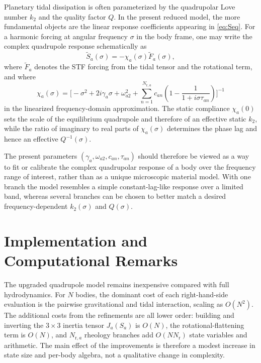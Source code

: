 \documentclass[journal, a4paper]{IEEEtran}
\begin{document}
Planetary tidal dissipation is often parameterized by the quadrupolar Love
number $k_2$ and the quality factor $Q$. In the present reduced model, the
more fundamental objects are the linear response coefficients appearing in
\eqref{eq:Seq}. For a harmonic forcing at angular frequency $\sigma$ in the
body frame, one may write the complex quadrupole response schematically as
\begin{equation}
\widetilde S_a(\sigma)
=
-\chi_a(\sigma)
\widetilde F_a(\sigma),
\label{eq:chiDef}
\end{equation}
where $\widetilde F_a$ denotes the STF forcing from the tidal tensor and the
rotational term, and where
\begin{equation}
\chi_a(\sigma)
=
\Biggl[
-\sigma^2
+2i\gamma_a\sigma
+\omega_{a2}^2
+\sum_{n=1}^{N_{\mathrm{r},a}}
c_{an}
\left(
1-\frac{1}{1+i\sigma\tau_{an}}
\right)
\Biggr]^{-1}
\label{eq:chiModel}
\end{equation}
in the linearized frequency-domain approximation. The static compliance
$\chi_a(0)$ sets the scale of the equilibrium quadrupole and therefore of an
effective static $k_2$, while the ratio of imaginary to real parts of
$\chi_a(\sigma)$ determines the phase lag and hence an effective
$Q^{-1}(\sigma)$.

The present parameters $(\gamma_a,\omega_{a2},c_{an},\tau_{an})$ should
therefore be viewed as a way to fit or calibrate the complex quadrupolar response of a
body over the frequency range of interest, rather than as a unique microscopic
material model. With one branch the model resembles a simple constant-lag-like
response over a limited band, whereas several branches can be chosen to better
match a desired frequency-dependent $k_2(\sigma)$ and $Q(\sigma)$.

\section{Implementation and Computational Remarks}

The upgraded quadrupole model remains inexpensive compared with full
hydrodynamics. For $N$ bodies, the dominant cost of each right-hand-side
evaluation is the pairwise gravitational and tidal interaction, scaling as
$O(N^2)$. The additional costs from the refinements are all lower order:
building and inverting the $3\times3$ inertia tensor $J_a(S_a)$ is $O(N)$,
the rotational-flattening term is $O(N)$, and $N_{\mathrm{r},a}$ rheology
branches add $O(NN_{\mathrm{r}})$ state variables and arithmetic. The main
effect of the improvements is therefore a modest increase in state size and
per-body algebra, not a qualitative change in complexity.
\end{document}

